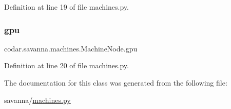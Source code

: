 Definition at line 19 of file machines.\+py.

\mbox{\label{classcodar_1_1savanna_1_1machines_1_1_machine_node_a2ccec1288c1472fc0a5af7787e48da22}} 
\subsubsection{\texorpdfstring{gpu}{gpu}}
{\footnotesize\ttfamily codar.\+savanna.\+machines.\+Machine\+Node.\+gpu}



Definition at line 20 of file machines.\+py.



The documentation for this class was generated from the following file\+:\begin{DoxyCompactItemize}
\item 
savanna/\hyperlink{machines_8py}{machines.\+py}\end{DoxyCompactItemize}
